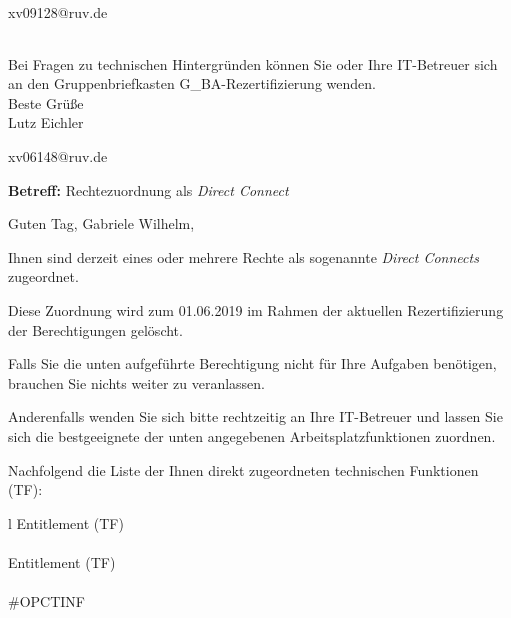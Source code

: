 \documentclass[a4paper,landscape,12pt]{letter}
\begin{document}
\begin{letter}{xv09128@ruv.de\hfill \break}
\begin{tiny}
\begin{longtable}{|p{35mm}|p{15mm}|p{25mm}|p{10mm}|p{40mm}|p{50mm}|p{50mm}|}
\hline
		\end{longtable}
		\end{tiny}
	
\begin{minipage}{\textwidth}
			Bei Fragen zu technischen Hintergründen können Sie 
			oder Ihre IT-Betreuer sich an den Gruppenbriefkasten 
			G\_BA-Rezertifizierung
			wenden.\\
			\linebreak
			Beste Grüße\\
			Lutz Eichler
	\end{minipage}
	\end{letter}
	
\begin{letter}{xv06148@ruv.de\hfill \break}
\begin{normalsize}
	\opening{\textbf{Betreff:} Rechtezuordnung als \emph{Direct Connect}}
	\begin{normalsize} \hfill
	\end{normalsize}

	\begin{normalsize}
		Guten Tag, 
	Gabriele Wilhelm, \hfill \break
	\end{normalsize}
	\end{normalsize}
	
\begin{normalsize}
	Ihnen sind derzeit eines oder mehrere Rechte als sogenannte \emph{Direct Connects} zugeordnet.
	
	Diese Zuordnung wird zum 01.06.2019 im Rahmen der aktuellen Rezertifizierung der Berechtigungen gelöscht.
	
	Falls Sie die unten aufgeführte Berechtigung nicht für Ihre Aufgaben benötigen, 
	brauchen Sie nichts weiter zu veranlassen.
	
	Anderenfalls wenden Sie sich bitte rechtzeitig an Ihre IT-Betreuer 
	und lassen Sie sich die bestgeeignete der unten angegebenen Arbeitsplatzfunktionen zuordnen.
	\end{normalsize}
	
\begin{normalsize}
	Nachfolgend die Liste der Ihnen direkt zugeordneten technischen Funktionen (TF):

	\begin{longtable}{l}
		Entitlement (TF) \\ \hline
		\endfirsthead
		\\\hline
		Entitlement (TF) \\ \hline
		\endhead %
		\multicolumn{1}{r@{}}{Fortsetzung \ldots}\\
		\endfoot
		\hline
		\endlastfoot
	\#OPCTINF\\
	\end{longtable}
	\end{normalsize}
	

\end{letter}
\end{document}
